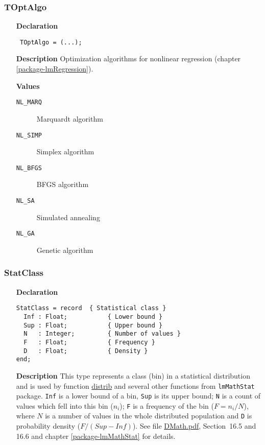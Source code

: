 \documentclass[12pt,a4paper,oneside]{report}
\newcommand{\declarationitem}[1]{\textbf{#1}}
\newcommand{\descriptiontitle}[1]{\textbf{#1}}
\newcommand{\code}[1]{\texttt{#1}}
\begin{document}
\subsubsection{TOptAlgo}
\label{utypes-TOptAlgo}
\begin{itemize}\item[\declarationitem{Declaration}\hfill]
	\begin{flushleft}
		\code{
			TOptAlgo = (...);}
		
	\end{flushleft}
	
	\par
	\item[\descriptiontitle{Description}]
	Optimization algorithms for nonlinear regression (chapter \ref{package-lmRegression}).
		\item[\textbf{Values}]
	\begin{description}
		\item[\texttt{NL{\_}MARQ}] Marquardt algorithm
		\item[\texttt{NL{\_}SIMP}] Simplex algorithm
		\item[\texttt{NL{\_}BFGS}] BFGS algorithm
		\item[\texttt{NL{\_}SA}] Simulated annealing
		\item[\texttt{NL{\_}GA}] Genetic algorithm
	\end{description}
\end{itemize}

\subsubsection{StatClass}\label{sec:statclass}
\begin{itemize}
	\item[\declarationitem{Declaration}\hfill]
	\begin{verbatim}
StatClass = record  { Statistical class }
  Inf : Float;           { Lower bound }
  Sup : Float;           { Upper bound }
  N   : Integer;         { Number of values }
  F   : Float;           { Frequency }
  D   : Float;           { Density }
end;
	\end{verbatim}
	\item[\descriptiontitle{Description}]
This type represents a class (bin) in a statistical distribution and is used by function \hyperref[udistrib]{distrib} and several other functions from \code{lmMathStat} package. 
\code{Inf} is a lower bound of a bin, \code{Sup} is its upper bound; \code{N} is a count of values which fell into this bin ($n_i$); \code{F} is a frequency of the bin ($F=n_i/N$), where $N$ is a number of values in the whole distributed population and \code{D} is probability density ($F/(Sup-Inf)$).
See file \href{DMath.pdf}{DMath.pdf}, Section~16.5 and 16.6 and chapter \ref{package-lmMathStat} for details. 
\end{itemize}
\end{document}

